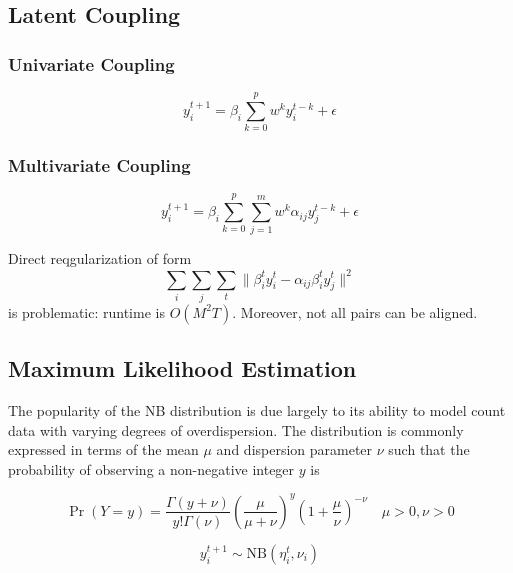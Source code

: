 \documentclass{article}
\begin{document}
\subsection{Latent Coupling}
\label{sec:orgcd8f8cd}

\subsubsection{Univariate Coupling}
\label{sec:orgf421778}
\begin{equation}
    y_i^{t+1} = \beta_i \sum_{k=0}^p w^k y_i^{t-k} + \epsilon
\end{equation}

\subsubsection{Multivariate Coupling}
\label{sec:orge92bbb3}
\begin{equation}
    y_i^{t+1} = \beta_i \sum_{k=0}^p \sum_{j=1}^m w^k \alpha_{ij} y_j^{t-k} + \epsilon
\end{equation}

Direct reqgularization of form
\begin{equation*}
    \sum_i\sum_j\sum_t\|\beta_i^t y_i^t - \alpha_{ij}\beta_i^t y_j^t\|^2
\end{equation*}
is problematic: runtime is \(O(M^2T)\). Moreover, not all pairs can be aligned.



\subsection{Maximum Likelihood Estimation}
\label{sec:orgb473ba4}
The popularity of the NB distribution is due largely to its ability to model
count data with varying degrees of overdispersion. The distribution is commonly
expressed in terms of the mean \(\mu\) and dispersion parameter \(\nu\) such that the
probability of observing a non-negative integer \(y\) is

\begin{equation*}
\Pr(Y = y) = \frac{\Gamma(y + \nu)}{y!\Gamma(\nu)}\left(\frac{\mu}{\mu +\nu}\right)^{y}\left(1 + \frac{\mu}{\nu}\right)^{-\nu}
\quad \mu > 0, \nu > 0
\end{equation*}

\begin{equation*}
    y^{t+1}_{i} \sim \text{NB}(\eta_i^{t}, \nu_i)
\end{equation*}
\end{document}
